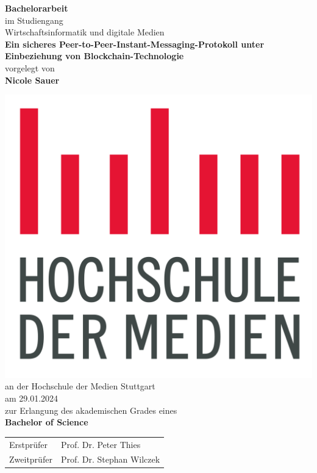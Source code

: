 \documentclass[11pt, a4paper]{report}
\begin{document}
    \begin{titlepage}
        \begin{center}
            
            \vspace*{1cm}
            \LARGE
            \textbf{Bachelorarbeit}\\

            \Large
            \bigbreak
            im Studiengang \\
            Wirtschaftsinformatik und digitale Medien\\

            \vspace*{1cm}
            \LARGE
            \textbf{Ein sicheres Peer-to-Peer-Instant-Messaging-Protokoll unter Einbeziehung von Blockchain-Technologie}\\
            
            \large
            \vspace*{1cm}
            vorgelegt von \\
            \vspace*{0.5cm}
            \textbf{Nicole Sauer} \\
            \vspace*{1cm}

            \includegraphics[width=0.2\linewidth]{images/hdm_logo.png} \\

            \vspace*{0.5cm}
            an der Hochschule der Medien Stuttgart \\
            am 29.01.2024 \\
            zur Erlangung des akademischen Grades eines \\
            \textbf{Bachelor of Science}\\
            \vspace*{1.5cm}
            \large 
            \begin{tabular}{ll}
                Erstprüfer & Prof. Dr. Peter Thies \\
                Zweitprüfer & Prof. Dr. Stephan Wilczek \\
            \end{tabular} \\
        \end{center}
    \end{titlepage}
\end{document}
